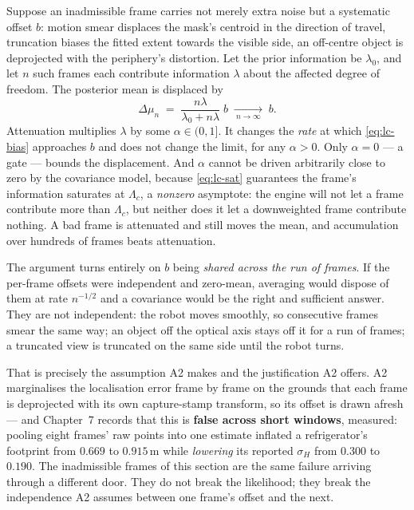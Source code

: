 \documentclass[11pt,a4paper]{report}
\begin{document}
Suppose an inadmissible frame carries not merely extra noise but a systematic offset $b$: motion
smear displaces the mask's centroid in the direction of travel, truncation biases the fitted extent
towards the visible side, an off-centre object is deprojected with the periphery's distortion. Let
the prior information be $\lambda_0$, and let $n$ such frames each contribute information $\lambda$
about the affected degree of freedom. The posterior mean is displaced by
\begin{equation}
\Delta\mu_n \;=\; \frac{n\lambda}{\lambda_0+n\lambda}\;b
\;\xrightarrow[\ n\to\infty\ ]{}\; b .
\label{eq:lc-bias}
\end{equation}
Attenuation multiplies $\lambda$ by some $\alpha\in(0,1]$. It changes the \emph{rate} at which
\eqref{eq:lc-bias} approaches $b$ and does not change the limit, for any $\alpha>0$. Only $\alpha=0$
--- a gate --- bounds the displacement. And $\alpha$ cannot be driven arbitrarily close to zero by
the covariance model, because \eqref{eq:lc-sat} guarantees the frame's information saturates at
$\Lambda_c$, a \emph{nonzero} asymptote: the engine will not let a frame contribute more than
$\Lambda_c$, but neither does it let a downweighted frame contribute nothing. A bad frame is
attenuated and still moves the mean, and accumulation over hundreds of frames beats attenuation.

The argument turns entirely on $b$ being \emph{shared across the run of frames}. If the per-frame
offsets were independent and zero-mean, averaging would dispose of them at rate $n^{-1/2}$ and a
covariance would be the right and sufficient answer. They are not independent: the robot moves
smoothly, so consecutive frames smear the same way; an object off the optical axis stays off it for
a run of frames; a truncated view is truncated on the same side until the robot turns.

That is precisely the assumption A2 makes and the justification A2 offers. A2 marginalises the
localisation error frame by frame on the grounds that each frame is deprojected with its own
capture-stamp transform, so its offset is drawn afresh --- and Chapter~7 records that this is
\textbf{false across short windows}, measured: pooling eight frames' raw points into one estimate
inflated a refrigerator's footprint from $0.669$ to $0.915$\,m while \emph{lowering} its reported
$\sigma_H$ from $0.300$ to $0.190$. The inadmissible frames of this section are the same failure
arriving through a different door. They do not break the likelihood; they break the
independence A2 assumes between one frame's offset and the next.
\end{document}
